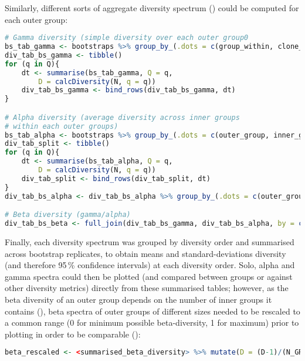 \noindent Similarly, different sorts of aggregate diversity spectrum () could be computed for each outer group:

\begin{lstlisting}[language=R]
# Gamma diversity (simple diversity over each outer group0
bs_tab_gamma <- bootstraps %>% group_by_(.dots = c(group_within, clone_field, "ITER")) %>% summarise(N = sum(N)) %>% group_by_(.dots = c(outer_group, "ITER"))
div_tab_bs_gamma <- tibble()
for (q in Q){
	dt <- summarise(bs_tab_gamma, Q = q,
		D = calcDiversity(N, q = q))
	div_tab_bs_gamma <- bind_rows(div_tab_bs_gamma, dt)
}

# Alpha diversity (average diversity across inner groups
# within each outer groups)
bs_tab_alpha <- bootstraps %>% group_by_(.dots = c(outer_group, inner_group, "ITER"))
div_tab_split <- tibble()
for (q in Q){
	dt <- summarise(bs_tab_alpha, Q = q,
		D = calcDiversity(N, q = q))
	div_tab_split <- bind_rows(div_tab_split, dt)
}
div_tab_bs_alpha <- div_tab_bs_alpha %>% group_by_(.dots = c(outer_group, "ITER", "Q")) %>% summarise(D = ifelse(dplyr::first(Q) != 1, mean(D^(1-dplyr::first(Q)))^(1/(1-dplyr::first(Q))),  exp(mean(log(D)))), N_GROUP = n())

# Beta diversity (gamma/alpha)
div_tab_bs_beta <- full_join(div_tab_bs_gamma, div_tab_bs_alpha, by = c(outer_group, "ITER", "Q"), suffix = c("_GAMMA", "_ALPHA")) %>% mutate(D= D_GAMMA/D_ALPHA) %>% select(-D_GAMMA, -D_ALPHA)
\end{lstlisting}

\noindent Finally, each diversity spectrum was grouped by diversity order and summarised across bootstrap replicates, to obtain means and standard-deviations diversity (and therefore 95\,\% confidence intervals) at each diversity order. Solo, alpha and gamma spectra could then be plotted (and compared between groups or against other diversity metrics) directly from these summarised tables; however, as the beta diversity of an outer group depends on the number of inner groups it contains (), beta spectra of outer groups of different sizes needed to be rescaled to a common range (0 for minimum possible beta-diversity, 1 for maximum) prior to plotting in order to be comparable ():

\begin{lstlisting}[language=R]
beta_rescaled <- <summarised_beta_diversity> %>% mutate(D = (D-1)/(N_GROUP-1), D_UPPER = (D_UPPER-1)/(N_GROUP-1), D_LOWER = (D_LOWER-1)/(N_GROUP-1), D_SD = D_SD/(N_GROUP-1)) %>% select(-N_GROUP)
\end{lstlisting}

